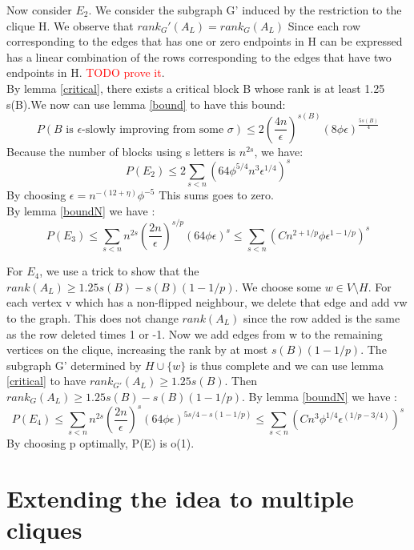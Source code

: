 \documentclass[12pt]{article}
\begin{document}
Now consider $E_2$. We consider the subgraph G' induced by the restriction to the clique H. We observe that $rank_G'(A_L) = rank_G(A_L)$ Since each row corresponding to the edges that has one or zero endpoints in H can be expressed has a linear combination of the rows corresponding to the edges that have two endpoints in H. \textcolor{red}{TODO prove it}. \\
By lemma \ref{critical}, there exists a critical block B whose rank is at least 1.25 s(B).We now can use lemma \ref{bound} to have this bound:
\begin{equation*}
P(B \text{ is }\epsilon \text {-slowly improving from some }\sigma) \leq 2(\frac{4n}{\epsilon})^{s(B)}(8\phi\epsilon)^{\frac{5s(B)}{4}}
\end{equation*}
Because the number of blocks using s letters is $n^{2s}$, we have:
\begin{equation*}
P(E_2) \leq 2 \sum_{s < n}(64\phi^{5/4}n^3\epsilon^{1/4})^s
\end{equation*}
By choosing $\epsilon = n^{-(12 + \eta)}\phi^{-5}$ This sums goes to zero.\\

By lemma \ref{boundN} we have :
\begin{equation*}
P(E_3) \leq  \sum_{s < n}n^{2s}(\dfrac{2n}{\epsilon})^{s/p}(64\phi\epsilon)^{s} \leq \sum_{s < n}(Cn^{2 + 1/p}\phi\epsilon^{1 - 1/p})^{s}
\end{equation*}

For $E_4$, we use a trick to show that the $rank(A_L) \geq 1.25s(B) - s(B)(1 - 1/p)$. We choose some $w \in V \setminus H$. For each vertex v which has a non-flipped neighbour, we delete that edge and add vw to the graph. This does not change $rank(A_L)$ since the row added is the same as the row deleted times 1 or -1. Now we add edges from w to the remaining vertices on the clique, increasing the rank by at most $s(B)(1 - 1/p)$. The subgraph G' determined by $H \cup \{w\}$ is thus complete and we can use  lemma \ref{critical} to have $rank_{G'}(A_L) \geq 1.25 s(B)$. Then $rank_G(A_L) \geq 1.25s(B) - s(B)(1 - 1/p)$.
By lemma \ref{boundN} we have :
\begin{equation*}
P(E_4) \leq  \sum_{s < n}n^{2s}(\dfrac{2n}{\epsilon})^{s}(64\phi\epsilon)^{5s/4 - s(1 - 1/p)} \leq \sum_{s < n}(Cn^{3}\phi^{1/4}\epsilon^{(1/p - 3/4)})^{s}
\end{equation*}
By choosing p optimally, P(E) is o(1). 

\section{Extending the idea to multiple cliques}
\end{document}

